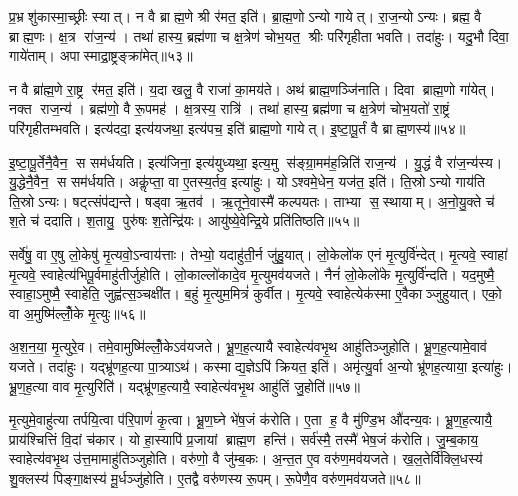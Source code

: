 प्र॒भ्रशु॑कास्मा॒च्छ्रीः स्यात्। न वै ब्राह्म॒णे श्री र॑मत॒ इति॑। ब्रा॒ह्म॒णोऽन्यो गायेत्। रा॒ज॒न्योऽन्यः। ब्रह्म॒ वै ब्राह्म॒णः। क्ष॒त्र रा॑ज॒न्य॑। तथा॑ हास्य॒ ब्रह्म॑णा च क्ष॒त्रेण॑ चोभ॒यत॒ श्रीः परि॑गृहीता भवति। तदा॑हुः। यदु॒भौ दिवा॒ गाये॑ताम्। अपास्माद्रा॒ष्ट्रङ्क्रा॑मेत्॥५३॥

न वै ब्रा॑ह्म॒णे रा॒ष्ट्र र॑मत॒ इति॑। य॒दा खलु॒ वै राजा॑ का॒मय॑ते। अथ॑ ब्राह्म॒णञ्जि॑नाति। दिवा ब्राह्म॒णो गा॑येत्। नक्त राज॒न्य॑। ब्रह्म॑णो॒ वै रू॒पमह॑। क्ष॒त्रस्य॒ रात्रि॑। तथा॑ हास्य॒ ब्रह्म॑णा च क्ष॒त्रेण॑ चोभ॒यतो॑ रा॒ष्ट्रं परि॑गृहीतम्भवति। इत्य॑ददा॒ इत्य॑यजथा॒ इत्य॑पच॒ इति॑ ब्राह्म॒णो गायेत्। इ॒ष्टा॒पू॒र्तं वै ब्राह्म॒णस्य॑॥५४॥

इ॒ष्टा॒पू॒र्तेनै॒वैन॒ स सम॑र्धयति। इत्य॑जिना॒ इत्य॑युध्यथा॒ इत्य॒मु स॑ङ्ग्रा॒मम॑ह॒न्निति॑ राज॒न्य॑। यु॒द्धं वै रा॑ज॒न्य॑स्य। यु॒द्धेनै॒वैन॒ स सम॑र्धयति। अकॢ॑प्ता॒ वा ए॒तस्य॒र्तव॒ इत्या॑हुः। योऽश्वमे॒धेन॒ यज॑त॒ इति॑। ति॒स्रोऽन्यो गाय॑ति ति॒स्रोऽन्यः। षट्त्संप॑द्यन्ते। षड्वा ऋ॒तव॑। ऋ॒तूने॒वास्मै॑ कल्पयतः। ताभ्या स॒स्थायाम्। अ॒नो॒यु॒क्ते च॑ श॒ते च॑ ददाति। श॒तायु॒ पुरु॑षः श॒तेन्द्रि॑यः। आयु॑ष्ये॒वेन्द्रि॒ये प्रति॑तिष्ठति॥५५॥\anuvakamend[गाये॑ताङ्क्रामेद्ब्राह्म॒णस्य॑ कल्पयतश्च॒त्वारि॑ च]

सर्वे॑षु॒ वा ए॒षु लो॒केषु॑ मृ॒त्यवो॒ऽन्वाय॑त्ताः। तेभ्यो॒ यदाहु॑ती॒र्न जु॑हु॒यात्। लो॒केलो॑क एनं मृ॒त्युर्वि॑न्देत्। मृ॒त्यवे॒ स्वाहा॑ मृ॒त्यवे॒ स्वाहेत्य॑भिपू॒र्वमाहु॑तीर्जुहोति। लो॒काल्लो॑कादे॒व मृ॒त्युमव॑यजते। नैनं॑ लो॒केलो॑के मृ॒त्युर्वि॑न्दति। यद॒मुष्मै॒ स्वाहा॒ऽमुष्मै॒ स्वाहेति॒ जुह्व॑त्स॒ञ्चक्षी॑त। ब॒हुं मृ॒त्युम॒मित्रं॑ कुर्वीत। मृ॒त्यवे॒ स्वाहेत्येक॑स्मा ए॒वैकाञ्जुहुयात्। एको॒ वा अ॒मुष्मि॑ल्लोँ॒के मृ॒त्युः॥५६॥

अ॒श॒न॒या॒ मृ॒त्युरे॒व। तमे॒वामुष्मि॑ल्लोँ॒केऽव॑यजते। भ्रू॒ण॒ह॒त्यायै स्वाहेत्य॑वभृ॒थ आहु॑तिञ्जुहोति। भ्रू॒ण॒ह॒त्यामे॒वाव॑ यजते। तदा॑हुः। यद्भ्रू॑णह॒त्या पा॒त्र्याऽथ॑। कस्माद्य॒ज्ञेऽपि॑ क्रियत॒ इति॑। अमृ॑त्यु॒र्वा अ॒न्यो भ्रू॑णह॒त्याया॒ इत्या॑हुः। भ्रू॒ण॒ह॒त्या वाव मृ॒त्युरिति॑। यद्भ्रू॑णह॒त्यायै॒ स्वाहेत्य॑वभृ॒थ आहु॑तिं जु॒होति॑॥५७॥

मृ॒त्युमे॒वाहु॑त्या तर्पयि॒त्वा प॑रि॒पाणं॑ कृ॒त्वा। भ्रू॒ण॒घ्ने भे॑ष॒जं क॑रोति। ए॒ता ह॒ वै मु॑ण्डि॒भ औ॑दन्य॒वः। भ्रू॒ण॒ह॒त्यायै॒ प्राय॑श्चित्तिं वि॒दां च॑कार। यो हा॒स्यापि॑ प्र॒जायां ब्राह्म॒ण हन्ति॑। सर्व॑स्मै॒ तस्मै॑ भेष॒जं क॑रोति। जु॒म्ब॒काय॒ स्वाहेत्य॑वभृ॒थ उ॑त्त॒मामाहु॑तिञ्जुहोति। वरु॑णो॒ वै जु॑म्ब॒कः। अ॒न्त॒त ए॒व वरु॑ण॒मव॑यजते। ख॒ल॒तेर्वि॑क्लि॒धस्य॑ शु॒क्लस्य॑ पिङ्गा॒क्षस्य॑ मू॒र्धञ्जु॑होति। ए॒तद्वै वरु॑णस्य रू॒पम्। रू॒पेणै॒व वरु॑ण॒मव॑यजते॥५८॥\anuvakamend[लो॒के मृ॒त्युर्जु॒होति॑ मू॒र्धञ्जु॑होति॒ द्वे च॑]

